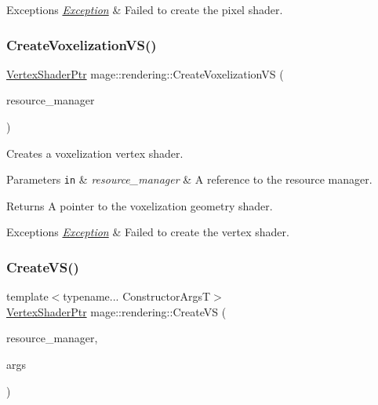 \begin{DoxyExceptions}{Exceptions}
{\em \mbox{\hyperlink{classmage_1_1_exception}{Exception}}} & Failed to create the pixel shader. \\
\hline
\end{DoxyExceptions}
\mbox{\label{namespacemage_1_1rendering_a00366c24902efdf909d9238ff8203fdb}} 
\subsubsection{\texorpdfstring{Create\+Voxelization\+V\+S()}{CreateVoxelizationVS()}}
{\footnotesize\ttfamily \mbox{\hyperlink{namespacemage_1_1rendering_aaf704b9c54a4181f4950a1761de69dda}{Vertex\+Shader\+Ptr}} mage\+::rendering\+::\+Create\+Voxelization\+VS (\begin{DoxyParamCaption}\item[{\mbox{\hyperlink{classmage_1_1rendering_1_1_resource_manager}{Resource\+Manager}} \&}]{resource\+\_\+manager }\end{DoxyParamCaption})}

Creates a voxelization vertex shader.


\begin{DoxyParams}[1]{Parameters}
\mbox{\tt in}  & {\em resource\+\_\+manager} & A reference to the resource manager. \\
\hline
\end{DoxyParams}
\begin{DoxyReturn}{Returns}
A pointer to the voxelization geometry shader. 
\end{DoxyReturn}

\begin{DoxyExceptions}{Exceptions}
{\em \mbox{\hyperlink{classmage_1_1_exception}{Exception}}} & Failed to create the vertex shader. \\
\hline
\end{DoxyExceptions}
\mbox{\label{namespacemage_1_1rendering_a0560d70d2fe6382213ca07b993d8b028}} 
\subsubsection{\texorpdfstring{Create\+V\+S()}{CreateVS()}}
{\footnotesize\ttfamily template$<$typename... Constructor\+ArgsT$>$ \\
\mbox{\hyperlink{namespacemage_1_1rendering_aaf704b9c54a4181f4950a1761de69dda}{Vertex\+Shader\+Ptr}} mage\+::rendering\+::\+Create\+VS (\begin{DoxyParamCaption}\item[{\mbox{\hyperlink{classmage_1_1rendering_1_1_resource_manager}{Resource\+Manager}} \&}]{resource\+\_\+manager,  }\item[{Constructor\+ArgsT \&\&...}]{args }\end{DoxyParamCaption})}

